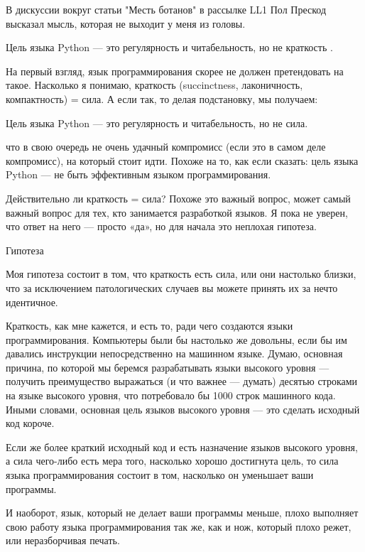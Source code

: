 \documentclass[ebook,12pt,oneside,openany]{memoir}
\begin{document}
\maketitle

В дискуссии вокруг статьи "Месть ботанов" в рассылке LL1 Пол Прескод
высказал мысль, которая не выходит у меня из головы.

Цель языка Python — это регулярность и читабельность, но не краткость
.

На первый взгляд, язык программирования скорее не должен претендовать
на такое. Насколько я понимаю, краткость (succinctness, лаконичность,
компактность) = сила. А если так, то делая подстановку, мы получаем:

Цель языка Python — это регулярность и читабельность, но не сила.

что в свою очередь не очень удачный компромисс (если это в самом деле
компромисс), на который стоит идти. Похоже на то, как если сказать:
цель языка Python — не быть эффективным языком программирования.

Действительно ли краткость = сила? Похоже это важный вопрос, может
самый важный вопрос для тех, кто занимается разработкой языков. Я пока
не уверен, что ответ на него — просто «да», но для начала это неплохая
гипотеза.

Гипотеза

Моя гипотеза состоит в том, что краткость есть сила, или они настолько
близки, что за исключением патологических случаев вы можете принять их
за нечто идентичное.

Краткость, как мне кажется, и есть то, ради чего создаются языки
программирования. Компьютеры были бы настолько же довольны, если бы им
давались инструкции непосредственно на машинном языке. Думаю, основная
причина, по которой мы беремся разрабатывать языки высокого уровня —
получить преимущество выражаться (и что важнее — думать) десятью
строками на языке высокого уровня, что потребовало бы 1000 строк
машинного кода. Иными словами, основная цель языков высокого уровня —
это сделать исходный код короче.

Если же более краткий исходный код и есть назначение языков высокого
уровня, а сила чего-либо есть мера того, насколько хорошо достигнута
цель, то сила языка программирования состоит в том, насколько он
уменьшает ваши программы.

И наоборот, язык, который не делает ваши программы меньше, плохо
выполняет свою работу языка программирования так же, как и нож,
который плохо режет, или неразборчивая печать.
\end{document}
